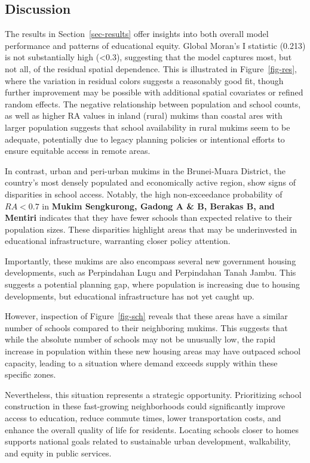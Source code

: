 \documentclass[
  12pt,
]{article}
\begin{document}
\subsection{Discussion}\label{discussion}

The results in Section~\ref{sec-results} offer insights into both
overall model performance and patterns of educational equity. Global
Moran's I statistic (0.213) is not substantially high (\textless0.3),
suggesting that the model captures most, but not all, of the residual
spatial dependence. This is illustrated in Figure~\ref{fig-res}, where
the variation in residual colors suggests a reasonably good fit, though
further improvement may be possible with additional spatial covariates
or refined random effects. The negative relationship between population
and school counts, as well as higher RA values in inland (rural) mukims
than coastal ares with larger population suggests that school
availability in rural mukims seem to be adequate, potentially due to
legacy planning policies or intentional efforts to ensure equitable
access in remote areas.

In contrast, urban and peri-urban mukims in the Brunei-Muara District,
the country's most densely populated and economically active region,
show signs of disparities in school access. Notably, the high
non-exceedance probability of \(RA < 0.7\) in \textbf{Mukim Sengkurong,
Gadong A \& B, Berakas B, and Mentiri} indicates that they have fewer
schools than expected relative to their population sizes. These
disparities highlight areas that may be underinvested in educational
infrastructure, warranting closer policy attention.

Importantly, these mukims are also encompass several new government
housing developments, such as Perpindahan Lugu and Perpindahan Tanah
Jambu. This suggests a potential planning gap, where population is
increasing due to housing developments, but educational infrastructure
has not yet caught up.

However, inspection of Figure~\ref{fig-sch} reveals that these areas
have a similar number of schools compared to their neighboring mukims.
This suggests that while the absolute number of schools may not be
unusually low, the rapid increase in population within these new housing
areas may have outpaced school capacity, leading to a situation where
demand exceeds supply within these specific zones.

Nevertheless, this situation represents a strategic opportunity.
Prioritizing school construction in these fast-growing neighborhoods
could significantly improve access to education, reduce commute times,
lower transportation costs, and enhance the overall quality of life for
residents. Locating schools closer to homes supports national goals
related to sustainable urban development, walkability, and equity in
public services.
\end{document}
